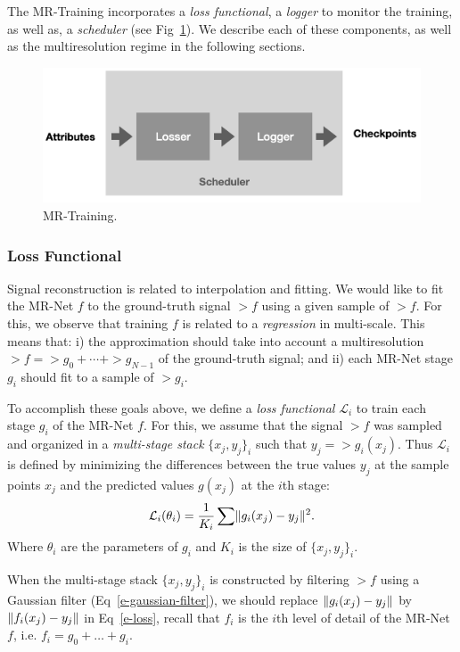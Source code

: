 The MR-Training incorporates a \textit{loss functional}, a \textit{logger} to monitor the training, as well as, a \textit{scheduler} (see Fig~\ref{f:training}). We describe each of these components, as well as the multiresolution regime in the following sections. 

\begin{figure}[!h]
\centering
\includegraphics[width=0.89\linewidth]{img/ch4/training.png}
\caption{MR-Training.}
\label{f:training}
\end{figure}

\subsubsection{Loss Functional}

Signal reconstruction is related to interpolation and fitting. We would like to fit the MR-Net $f$ to the ground-truth signal $\gt{f}$ using a given sample of $\gt{f}$.
For this, we observe that training $f$ is related to a \textit{regression} in multi-scale. This means that: i) the approximation should take into account a multiresolution $\gt{f}=\gt{g}_0+\cdots+\gt{g}_{N-1}$ of the ground-truth signal; and ii) each MR-Net stage $g_i$ should fit to a sample of $\gt{g}_i$.

To accomplish these goals above, we define a \emph{loss functional} $\mathcal{L}_i$ to train each stage $g_i$ of the MR-Net $f$. For this, we assume that the signal $\gt{f}$ was sampled and organized in a \textit{multi-stage stack} $\{x_j, y_j\}_i$ such that $y_j=\gt{g}_i(x_j)$.
 Thus $\mathcal{L}_i$ is defined by minimizing the differences between the true values $y_j$ at the sample points $x_j$ and the predicted values $g(x_j)$ at the $i$th stage: 
\begin{align}\label{e-loss}
    \mathcal{L}_i(\theta_i)=\frac{1}{K_i}\sum \lVert g_i(x_j)-y_j\rVert^2.
\end{align}
Where $\theta_i$ are the parameters of $g_i$ and $K_i$ is the size of $\{x_j, y_j\}_i$.

When the multi-stage stack $\{x_j, y_j\}_i$ is constructed by filtering $\gt{f}$ using a Gaussian filter (Eq~\ref{e-gaussian-filter}), we should replace $\lVert g_i(x_j)-y_j\rVert$ by $\lVert f_i(x_j)-y_j\rVert$ in Eq~\ref{e-loss}, recall that $f_i$ is the $i$th level of detail of the MR-Net $f$, i.e. $f_i=g_0+\dots+g_{i}$.

